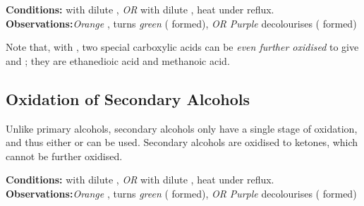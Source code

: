 				\vspace{1.5em}
				\vbox{\textbf{Conditions:}	\tabto{35mm} with dilute , \textit{OR}  with dilute ,
											\tabto{35mm}heat under reflux.}
				\vspace{0.5em}
				\vbox{\textbf{Observations:}\tabto{35mm}\textit{\color{BurntOrange}Orange} , turns \textit{\color{LimeGreen}green}
														( formed), \textit{OR}
											\tabto{35mm}\textit{\color{Plum}Purple}  decolourises ( formed)}



				Note that, with , two special carboxylic acids can be \textit{even further oxidised} to give  and ;
				they are ethanedioic acid and methanoic acid.





		\pagebreak
		\subsection{Oxidation of Secondary Alcohols}

			Unlike primary alcohols, secondary alcohols only have a single stage of oxidation, and thus either  or  can be
			used. Secondary alcohols are oxidised to ketones, which cannot be further oxidised.

			\vspace{1.5em}
			\vbox{\textbf{Conditions:}	\tabto{35mm} with dilute , \textit{OR}  with dilute ,
										\tabto{35mm}heat under reflux.}
			\vspace{0.5em}
			\vbox{\textbf{Observations:}\tabto{35mm}\textit{\color{BurntOrange}Orange} , turns \textit{\color{LimeGreen}green}
													( formed), \textit{OR}
										\tabto{35mm}\textit{\color{Plum}Purple}  decolourises ( formed)}

